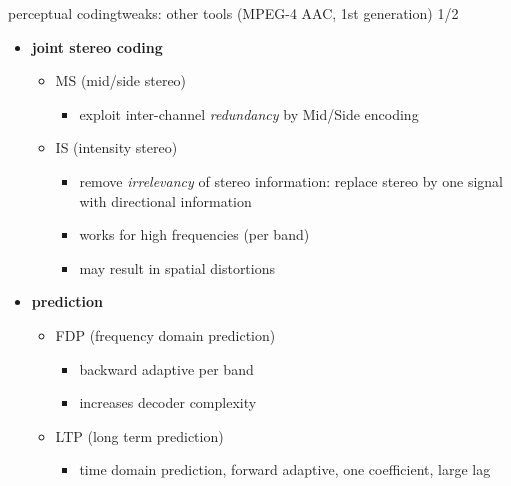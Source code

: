 	
	\begin{frame}{perceptual coding}{tweaks: other tools (MPEG-4 AAC, 1st generation) 1/2}
		\begin{itemize}
			\item	\textbf{joint stereo coding}
                \begin{itemize}
                    \item   MS (mid/side stereo)
                        \begin{itemize}
                            \item   exploit inter-channel \textit{redundancy} by Mid/Side encoding
                        \end{itemize}
                    \item   IS (intensity stereo)
                        \begin{itemize}
                            \item   remove \textit{irrelevancy} of stereo information: replace stereo by one signal with directional information
                            \item   works for high frequencies (per band)
                            \item   may result in spatial distortions
                        \end{itemize}
                \end{itemize}
            \pause
            \bigskip
            
            \item   \textbf{prediction}
                \begin{itemize}
                    \item   FDP (frequency domain prediction)
                        \begin{itemize}
                            \item   backward adaptive per band
                            \item   increases decoder complexity
                        \end{itemize}
                    \item   LTP (long term prediction)
                        \begin{itemize}
                            \item   time domain prediction, forward adaptive, one coefficient, large lag
                        \end{itemize}
                \end{itemize}
		\end{itemize}
	\end{frame}
